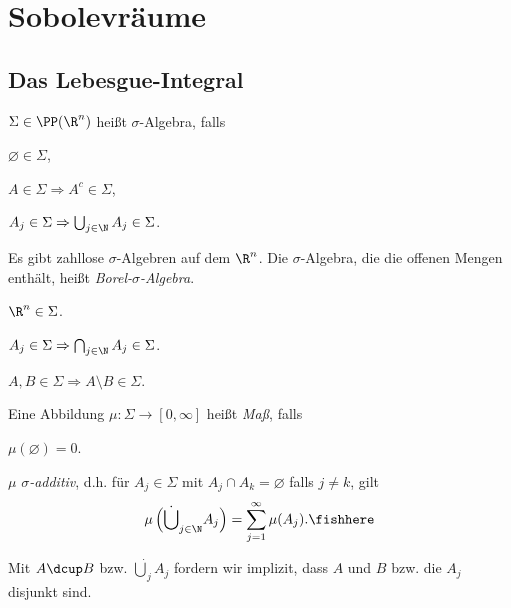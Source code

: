 \chapter{Sobolevräume}

\section{Das Lebesgue-Integral}

\begin{defn}
\label{defn:7.1}
$\Sigma\in\PP(\R^n)$ heißt $\sigma$-Algebra, falls
\begin{defnenum}
\item $\varnothing\in\Sigma$,
\item $A\in\Sigma\Rightarrow A^c\in\Sigma$,
\item $A_j\in \Sigma \Rightarrow \bigcup_{j\in\N} A_j \in \Sigma$.\fishhere
\end{defnenum}
\end{defn}

Es gibt zahllose $\sigma$-Algebren auf dem $\R^n$. Die $\sigma$-Algebra, die
die offenen Mengen enthält, heißt \emph{Borel-$\sigma$-Algebra}.

\begin{cor}
\label{prop:7.2}
\begin{propenum}
\item $\R^n\in\Sigma$.
\item $A_j\in\Sigma \Rightarrow \bigcap_{j\in\N} A_j \in \Sigma$.
\item $A,B\in\Sigma \Rightarrow A\setminus B\in\Sigma$.\fishhere
\end{propenum}
\end{cor}

\begin{defn}
\label{defn:7.3}
Eine Abbildung $\mu: \Sigma \to [0,\infty]$ heißt \emph{Maß}, falls
\begin{defnenum}
\item $\mu(\varnothing) = 0$.
\item $\mu$ \emph{$\sigma$-additiv}, d.h. für $A_j\in\Sigma$ mit $A_j\cap A_k =
\varnothing$ falls $j\neq k$, gilt
\begin{align*}
\mu\left(\dot{\bigcup}_{j\in\N} A_j\right) = \sum_{j=1}^\infty
\mu(A_j).\fishhere
\end{align*}
\end{defnenum}
\end{defn}

Mit $A \dcup B$ bzw. $\dot{\bigcup}_j A_j$ fordern wir implizit, dass $A$ und
$B$ bzw. die $A_j$ disjunkt sind.

